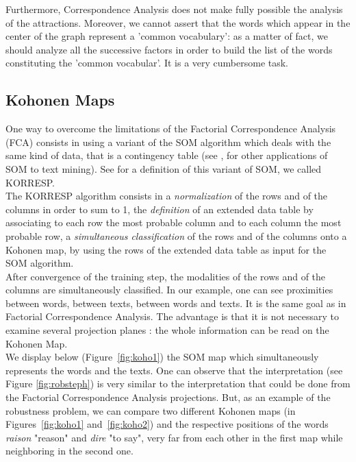 \documentclass[preprint]{elsarticle}
\begin{document}
Furthermore, Correspondence Analysis does not make fully possible the analysis of the attractions. Moreover, we cannot assert that the words which appear in the center of the graph represent a 'common vocabulary': as a matter of fact, we should  analyze all the successive factors in order to build the list of the words constituting the 'common vocabular'. It is a very cumbersome task.\\

\subsection{Kohonen Maps}

One way to overcome the limitations of the Factorial Correspondence Analysis (FCA) consists in using a variant of the SOM algorithm which deals with the same kind of data, that is a contingency table (see \cite{oja99},\cite{honkela} for other applications of SOM to text mining). See \cite{cottrell98} for a definition of this variant of SOM, we called KORRESP.\\

The KORRESP algorithm consists in a \textit{normalization} of the rows and of the columns in order to sum to 1, the \textit{definition} of an extended data table by associating to each row the most probable column and to each column the most probable row, a \textit{simultaneous classification} of the rows and of the columns onto a Kohonen map, by using the rows of the extended data table as input for the SOM algorithm.\\

After convergence of the training step, the modalities of the rows and of the columns are simultaneously classified. In our example, one can see proximities between words, between texts, between words and texts. It is the same goal as in Factorial Correspondence Analysis. The advantage is that it is not necessary to examine several projection planes : the whole information can be read on the Kohonen Map.\\

We display below (Figure~\ref{fig:koho1}) the SOM map which simultaneously represents the words and the texts. One can observe that the interpretation (see Figure \ref{fig:robsteph}) is very similar to the interpretation that could be done from the Factorial Correspondence Analysis projections.
But, as an example of the robustness problem, we can compare two different Kohonen maps (in Figures~\ref{fig:koho1} and~\ref{fig:koho2}) and the respective positions of the words \textit{raison} "reason" and \textit{dire} "to say", very far from each other in the first map while neighboring in the second one.\\
\end{document}
